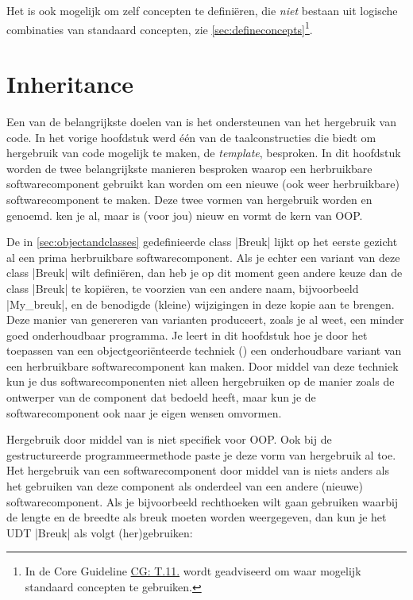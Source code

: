 \begin{cpplstShortInline}
Het is ook mogelijk om zelf concepten te definiëren, die \emph{niet} bestaan uit logische combinaties van standaard concepten, zie \cref{sec:defineconcepts}\footnote{%
	In de \Cpp{} Core Guideline \href{https://isocpp.github.io/CppCoreGuidelines/CppCoreGuidelines\#t11-whenever-possible-use-standard-concepts}{CG: T.11.} wordt geadviseerd om waar mogelijk standaard concepten te gebruiken.
}.


\chapter{Inheritance}
\label{sec:inheritance}
Een van de belangrijkste doelen van \Cpp{} is het ondersteunen van het hergebruik van code.
In het vorige hoofdstuk werd één van de taalconstructies die \Cpp{} biedt om hergebruik van code mogelijk te maken, de \emph{template}, besproken.
In dit hoofdstuk worden de twee belangrijkste manieren besproken waarop een herbruikbare softwarecomponent gebruikt kan worden om een nieuwe (ook weer herbruikbare) softwarecomponent te maken.
Deze twee vormen van hergebruik worden \emph{} en \emph{} genoemd.
 ken je al, maar  is (voor jou) nieuw en vormt de kern van OOP\@.

De in \cref{sec:objectandclasses} gedefinieerde class |Breuk| lijkt op het eerste gezicht al een prima herbruikbare softwarecomponent.
Als je echter een variant van deze class |Breuk| wilt definiëren, dan heb je op dit moment geen andere keuze dan de class |Breuk| te kopiëren, te voorzien van een andere naam, bijvoorbeeld |My_breuk|, en de benodigde (kleine) wijzigingen in deze kopie aan te brengen.
Deze manier van genereren van varianten produceert, zoals je al weet, een minder goed onderhoudbaar programma.
Je leert in dit hoofdstuk hoe je door het toepassen van een objectgeoriënteerde techniek () een onderhoudbare variant van een herbruikbare softwarecomponent kan maken.
Door middel van deze techniek kun je dus softwarecomponenten niet alleen hergebruiken op de manier zoals de ontwerper van
de component dat bedoeld heeft, maar kun je de softwarecomponent ook naar je eigen wensen omvormen.

Hergebruik door middel van \emph{} is niet specifiek voor OOP\@.
Ook bij de gestructureerde programmeermethode paste je deze vorm van hergebruik al toe.
Het hergebruik van een softwarecomponent door middel van  is niets anders als het gebruiken van deze component als onderdeel van een andere (nieuwe) softwarecomponent.
Als je bijvoorbeeld rechthoeken wilt gaan gebruiken waarbij de lengte en de breedte als breuk moeten worden weergegeven, dan kun je het UDT |Breuk| als volgt (her)gebruiken:


\end{cpplstShortInline}
